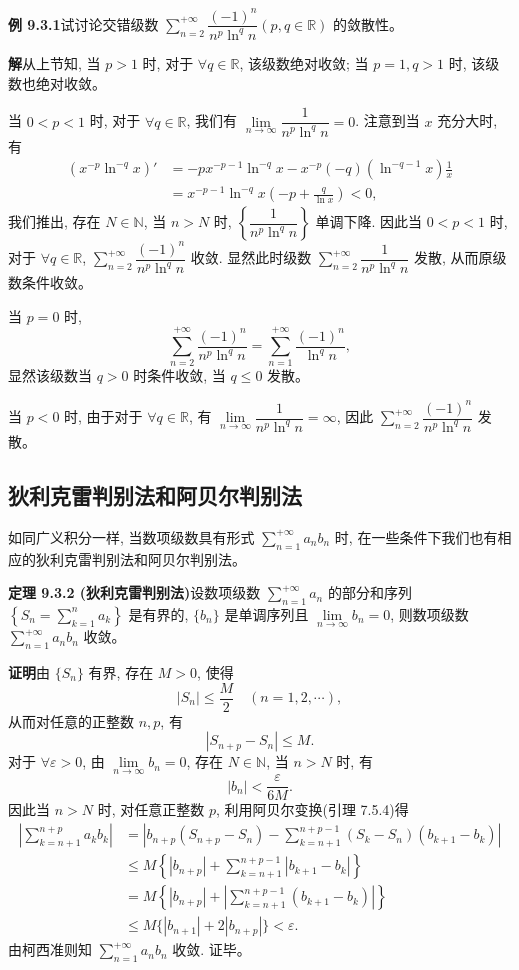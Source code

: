 \documentclass[UTF8, 12pt, fontset=fandol, oneside]{ctexart}
\begin{document}
\noindent\textbf{例 9.3.1}\quad 试讨论交错级数 $\sum\limits_{n=2}^{+\infty}\dfrac{(-1)^n}{n^p\ln^q n}(p,q\in\mathbb{R})$ 的敛散性。

\noindent\textbf{解}\quad 从上节知, 当 $p>1$ 时, 对于 $\forall q\in\mathbb{R}$, 该级数绝对收敛; 当 $p=1,q>1$ 时, 该级数也绝对收敛。

当 $0<p<1$ 时, 对于 $\forall q\in\mathbb{R}$, 我们有 $\lim\limits_{n\to\infty}\dfrac1{n^p\ln^q n}=0$. 注意到当 $x$ 充分大时, 有
\[
\begin{aligned}
  (x^{-p}\ln^{-q}x)'
  &=-px^{-p-1}\ln^{-q}x-x^{-p}(-q)(\ln^{-q-1}x)\frac1x\\
  &=x^{-p-1}\ln^{-q}x\left(-p+\frac{q}{\ln x}\right)<0,
\end{aligned}
\]
我们推出, 存在 $N\in\mathbb{N}$, 当 $n>N$ 时, $\left\{\dfrac1{n^p\ln^q n}\right\}$ 单调下降. 因此当 $0<p<1$ 时, 对于 $\forall q\in\mathbb{R}$, $\sum\limits_{n=2}^{+\infty}\dfrac{(-1)^n}{n^p\ln^q n}$ 收敛. 显然此时级数 $\sum\limits_{n=2}^{+\infty}\dfrac1{n^p\ln^q n}$ 发散, 从而原级数条件收敛。

当 $p=0$ 时,
\[
  \sum_{n=2}^{+\infty}\frac{(-1)^n}{n^p\ln^q n}
  =\sum_{n=1}^{+\infty}\frac{(-1)^n}{\ln^q n},
\]
显然该级数当 $q>0$ 时条件收敛, 当 $q\leq0$ 发散。

当 $p<0$ 时, 由于对于 $\forall q\in\mathbb{R}$, 有 $\lim\limits_{n\to\infty}\dfrac1{n^p\ln^q n}=\infty$, 因此 $\sum\limits_{n=2}^{+\infty}\dfrac{(-1)^n}{n^p\ln^q n}$ 发散。

\subsection{狄利克雷判别法和阿贝尔判别法}

如同广义积分一样, 当数项级数具有形式 $\sum\limits_{n=1}^{+\infty}a_nb_n$ 时, 在一些条件下我们也有相应的狄利克雷判别法和阿贝尔判别法。

\noindent\textbf{定理 9.3.2 (狄利克雷判别法)}\quad 设数项级数 $\sum\limits_{n=1}^{+\infty}a_n$ 的部分和序列 $\left\{S_n=\sum\limits_{k=1}^n a_k\right\}$ 是有界的, $\{b_n\}$ 是单调序列且 $\lim\limits_{n\to\infty}b_n=0$, 则数项级数 $\sum\limits_{n=1}^{+\infty}a_nb_n$ 收敛。

\noindent\textbf{证明}\quad 由 $\{S_n\}$ 有界, 存在 $M>0$, 使得
\[
  |S_n|\leq\frac{M}{2}\quad(n=1,2,\cdots),
\]
从而对任意的正整数 $n,p$, 有
\[
  |S_{n+p}-S_n|\leq M.
\]
对于 $\forall\varepsilon>0$, 由 $\lim\limits_{n\to\infty}b_n=0$, 存在 $N\in\mathbb{N}$, 当 $n>N$ 时, 有
\[
  |b_n|<\frac{\varepsilon}{6M}.
\]
因此当 $n>N$ 时, 对任意正整数 $p$, 利用阿贝尔变换(引理 7.5.4)得
\[
\begin{aligned}
  \left|\sum_{k=n+1}^{n+p}a_kb_k\right|
  &=\left|b_{n+p}(S_{n+p}-S_n)-\sum_{k=n+1}^{n+p-1}(S_k-S_n)(b_{k+1}-b_k)\right|\\
  &\leq M\left\{|b_{n+p}|+\sum_{k=n+1}^{n+p-1}|b_{k+1}-b_k|\right\}\\
  &=M\left\{|b_{n+p}|+\left|\sum_{k=n+1}^{n+p-1}(b_{k+1}-b_k)\right|\right\}\\
  &\leq M\{|b_{n+1}|+2|b_{n+p}|\}<\varepsilon.
\end{aligned}
\]
由柯西准则知 $\sum\limits_{n=1}^{+\infty}a_nb_n$ 收敛. 证毕。
\end{document}
